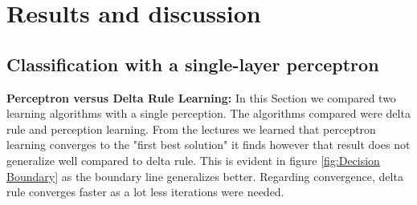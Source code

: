 \documentclass[a4paper]{article}
\begin{document}
\section{Results and discussion}
\subsection{Classification with a single-layer perceptron}
\textbf{Perceptron versus Delta Rule Learning: }In this Section we compared two learning algorithms with a single perception. The algorithms compared were delta rule and perception learning. From the lectures we learned that perceptron learning converges to the "first best solution" it finds however that result does not generalize well compared to delta rule. This is evident in figure \ref{fig:Decision Boundary} as the boundary line generalizes better. Regarding convergence, delta rule converges faster as a lot less iterations were needed. 
\end{document}
